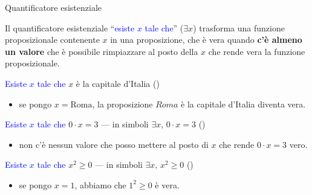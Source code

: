 \documentclass[aspectratio=169,10pt]{beamer}
\newcommand{\xmark}{{\color{red}{\ding{55}}}}
\newcommand{\quant}[1]{\textcolor{blue}{#1}}
\begin{document}
\begin{frame}{Quantificatore esistenziale}

    \begin{definition}
        Il quantificatore esistenziale ``\quant{esiste $x$ tale che}'' ($\exists x$) trasforma una funzione proposizionale contenente $x$ in una proposizione, che è vera quando \textbf{c'è almeno un valore} che è possibile rimpiazzare al posto della $x$ che rende vera la funzione proposizionale.
    \end{definition}

    \begin{example}
        \quant{Esiste $x$ tale che} $x$ è la capitale d'Italia \pause (\checkmark)
        \begin{itemize}
        \item se pongo $x=\text{Roma}$, la proposizione $Roma$  è la capitale d'Italia diventa vera.
        \end{itemize}
        \pause
        \quant{Esiste $x$ tale che} $0 \cdot x = 3$ --- in simboli $\exists x, \, 0 \cdot x = 3$ \pause (\xmark)
        \begin{itemize}
            \item non c'è nessun valore che posso mettere al posto di $x$ che rende $0 \cdot x = 3$ vero.
        \end{itemize}
        \pause
        \quant{Esiste $x$ tale che} $x^2 \geq 0$ --- in simboli $\exists x, \, x^2 \geq 0$ \pause (\checkmark)
        \begin{itemize}
            \item se pongo $x=1$, abbiamo che $1^2 \geq 0$ è vera.
        \end{itemize}
    \end{example}
\end{frame}
\end{document}
